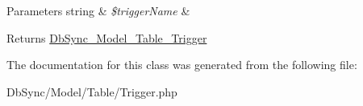 \begin{DoxyParams}[1]{Parameters}
string & {\em \$triggerName} & \\
\hline
\end{DoxyParams}
\begin{DoxyReturn}{Returns}
\hyperlink{classDbSync__Model__Table__Trigger}{DbSync\_\-Model\_\-Table\_\-Trigger} 
\end{DoxyReturn}


The documentation for this class was generated from the following file:\begin{DoxyCompactItemize}
\item 
DbSync/Model/Table/Trigger.php\end{DoxyCompactItemize}
